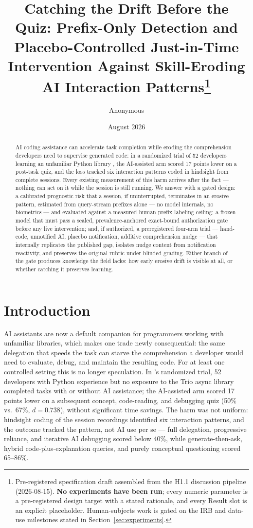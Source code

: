 \documentclass[11pt]{article}
\title{Catching the Drift Before the Quiz: Prefix-Only Detection and Placebo-Controlled Just-in-Time Intervention Against Skill-Eroding AI Interaction Patterns\thanks{Pre-registered specification draft assembled from the H1.1 discussion pipeline (2026-08-15). \textbf{No experiments have been run}; every numeric parameter is a pre-registered design target with a stated rationale, and every Result slot is an explicit placeholder. Human-subjects work is gated on the IRB and data-use milestones stated in Section~\ref{sec:experiments}.}}
\author{Anonymous}
\date{August 2026}
\begin{document}
\maketitle

\begin{abstract}
AI coding assistance can accelerate task completion while eroding the comprehension developers need to supervise generated code: in a randomized trial of 52 developers learning an unfamiliar Python library \citep{shen2026skill}, the AI-assisted arm scored 17 points lower on a post-task quiz, and the loss tracked six interaction patterns coded in hindsight from complete sessions. Every existing measurement of this harm arrives after the fact --- nothing can act on it while the session is still running. We answer with a gated design: a calibrated prognostic risk that a session, if uninterrupted, terminates in an erosive pattern, estimated from query-stream prefixes alone --- no model internals, no biometrics --- and evaluated against a measured human prefix-labeling ceiling; a frozen model that must pass a sealed, prevalence-anchored exact-bound authorization gate before any live intervention; and, if authorized, a preregistered four-arm trial --- hand-code, unnotified AI, placebo notification, additive comprehension nudge --- that internally replicates the published gap, isolates nudge content from notification reactivity, and preserves the original rubric under blinded grading. Either branch of the gate produces knowledge the field lacks: how early erosive drift is visible at all, or whether catching it preserves learning.
\end{abstract}

\section{Introduction}

AI assistants are now a default companion for programmers working with unfamiliar libraries, which makes one trade newly consequential: the same delegation that speeds the task can starve the comprehension a developer would need to evaluate, debug, and maintain the resulting code. For at least one controlled setting this is no longer speculation. In \citet{shen2026skill}'s randomized trial, 52 developers with Python experience but no exposure to the Trio async library completed tasks with or without AI assistance; the AI-assisted arm scored 17 points lower on a subsequent concept, code-reading, and debugging quiz (50\% vs.\ 67\%, $d = 0.738$), without significant time savings. The harm was not uniform: hindsight coding of the session recordings identified six interaction patterns, and the outcome tracked the pattern, not AI use per se --- full delegation, progressive reliance, and iterative AI debugging scored below 40\%, while generate-then-ask, hybrid code-plus-explanation queries, and purely conceptual questioning scored 65--86\%.
\end{document}
